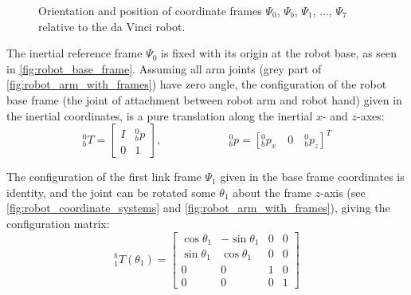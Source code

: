 \begin{figure}[htbp]
	\hspace{-15mm}
	\vspace{1mm}
	\hspace{10mm}
	\caption{Orientation and position of coordinate frames $\Psi_0$, $\Psi_b$, $\Psi_1$, ..., $\Psi_7$ relative to the da Vinci robot.}
	\label{fig:robot_frames}
\end{figure}

The inertial reference frame $\Psi_0$ is fixed with its origin at the robot base, as seen in \autoref{fig:robot_base_frame}. Assuming all arm joints (grey part of \autoref{fig:robot_arm_with_frames}) have zero angle, the configuration of the robot base frame (the joint of attachment between robot arm and robot hand) given in the inertial coordinates, is a pure translation along the inertial $x$- and $z$-axes:
\begin{equation}
^0_b T = \begin{bmatrix}
I & ^0_bp\\
0 & 1
\end{bmatrix}, 
\qquad\qquad\qquad
^0_bp = [^0_bp_x \quad 0 \quad ^0_bp_z]^T
\end{equation}

The configuration of the first link frame $\Psi_1$ given in the base frame coordinates is identity, and the joint can be rotated some $\theta_1$ about the frame $z$-axis (see \autoref{fig:robot_coordinate_systems} and \ref{fig:robot_arm_with_frames}), giving the configuration matrix:
\begin{equation}
^b_1 T(\theta_1) = 
\begin{bmatrix}
\cos\theta_1 & -\sin\theta_1 & 0 & 0\\
\sin\theta_1 & \cos\theta_1 & 0 & 0\\
0 & 0 & 1 & 0\\
0& 0& 0& 1
\end{bmatrix}
\end{equation}

